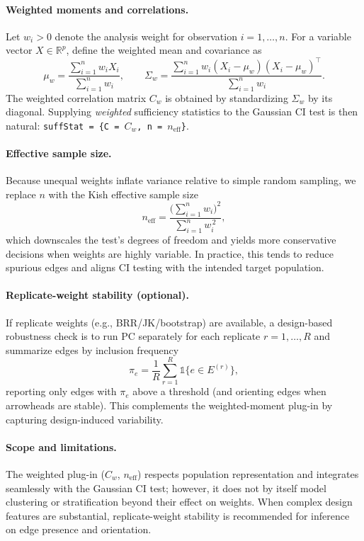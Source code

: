 \documentclass[11pt]{article}
\begin{document}
\paragraph{Weighted moments and correlations.} Let $w_i>0$ denote the analysis weight for observation $i=1,\ldots,n$. For a variable vector $X\in\mathbb{R}^p$, define the weighted mean and covariance as
\[
  \mu_w = \frac{\sum_{i=1}^n w_i X_i}{\sum_{i=1}^n w_i},\qquad
  \Sigma_w = \frac{\sum_{i=1}^n w_i (X_i-\mu_w)(X_i-\mu_w)^{\!\top}}{\sum_{i=1}^n w_i}.
\]
The weighted correlation matrix $C_w$ is obtained by standardizing $\Sigma_w$ by its diagonal. Supplying \emph{weighted} sufficiency statistics to the Gaussian CI test is then natural: \texttt{suffStat = \{C = $C_w$, n = $n_\mathrm{eff}$\}}.

\paragraph{Effective sample size.} Because unequal weights inflate variance relative to simple random sampling, we replace $n$ with the Kish effective sample size
\[
  n_{\mathrm{eff}} 
  = \frac{\big(\sum_{i=1}^n w_i\big)^2}{\sum_{i=1}^n w_i^{\,2}},
\]
which downscales the test's degrees of freedom and yields more conservative decisions when weights are highly variable. In practice, this tends to reduce spurious edges and aligns CI testing with the intended target population.

\paragraph{Replicate-weight stability (optional).} If replicate weights (e.g., BRR/JK/bootstrap) are available, a design-based robustness check is to run PC separately for each replicate $r=1,\ldots,R$ and summarize edges by inclusion frequency
\[
  \pi_e = \frac{1}{R} \sum_{r=1}^R \mathbb{1}\{e \in E^{(r)}\},
\]
reporting only edges with $\pi_e$ above a threshold (and orienting edges when arrowheads are stable). This complements the weighted-moment plug-in by capturing design-induced variability.

\paragraph{Scope and limitations.} The weighted plug-in ($C_w$, $n_{\mathrm{eff}}$) respects population representation and integrates seamlessly with the Gaussian CI test; however, it does not by itself model clustering or stratification beyond their effect on weights. When complex design features are substantial, replicate-weight stability is recommended for inference on edge presence and orientation.
\end{document}
